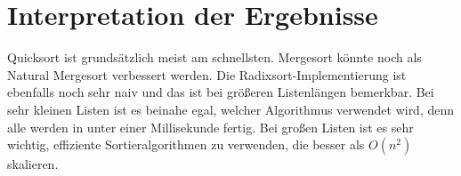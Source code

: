 \chapter{Interpretation der Ergebnisse}
Quicksort ist grundsätzlich meist am schnellsten. Mergesort könnte noch als Natural Mergesort verbessert werden. Die Radixsort-Implementierung ist ebenfalls noch sehr naiv und das ist bei größeren Listenlängen bemerkbar. Bei sehr kleinen Listen ist es beinahe egal, welcher Algorithmus verwendet wird, denn alle werden in unter einer Millisekunde fertig. Bei großen Listen ist es sehr wichtig, effiziente Sortieralgorithmen zu verwenden, die besser als $O(n^2)$ skalieren.